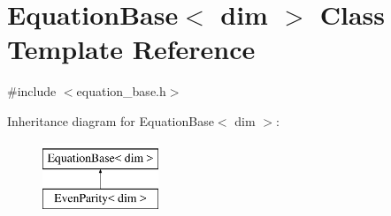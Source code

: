 \hypertarget{class_equation_base}{}\section{Equation\+Base$<$ dim $>$ Class Template Reference}
\label{class_equation_base}


{\ttfamily \#include $<$equation\+\_\+base.\+h$>$}

Inheritance diagram for Equation\+Base$<$ dim $>$\+:\begin{figure}[H]
\begin{center}
\leavevmode
\includegraphics[height=2.000000cm]{class_equation_base}
\end{center}
\end{figure}
